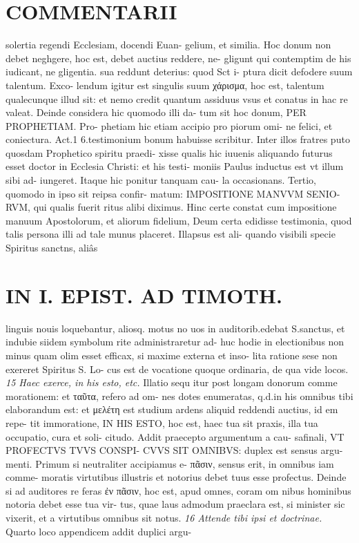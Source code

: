 \documentclass{article}
\begin{document}
\begin{pages}
\section*{COMMENTARII }
\marginpar{[ p.112 ]}\pstart solertia regendi Ecclesiam, docendi Euan- gelium, et similia. Hoc donum non debet neghgere, hoc est, debet auctius reddere, ne- gligunt qui contemptim de his iudicant, ne gligentia. sua reddunt deterius: quod Sct i- ptura dicit defodere suum talentum. Exco- lendum igitur est singulis suum χάρισμα, hoc est, talentum qualecunque illud sit: et nemo credit quantum assiduus vsus et conatus in hac re valeat.  \pend\pstart Deinde considera hic quomodo illi da- tum sit hoc donum, PER PROPHETIAM. Pro- phetiam hic etiam accipio pro piorum omi- ne felici, et coniectura. Act.1 6.testimonium bonum habuisse scribitur. Inter illos fratres puto quosdam Prophetico spiritu praedi- xisse qualis hic iuuenis aliquando futurus esset doctor in Ecclesia Christi: et his testi- moniis Paulus inductus est vt illum sibi ad- iungeret. Itaque hic ponitur tanquam cau- la occasionans.  \pend\pstart Tertio, quomodo in ipso sit reipsa confir- matum: IMPOSITIONE MANVVM SENIO- RVM, qui qualis fuerit ritus alibi diximus. Hinc certe constat cum impositione manuum Apostolorum, et aliorum fidelium, Deum certa edidisse testimonia, quod talis persona illi ad tale munus placeret. Illapsus est ali- quando visibili specie Spiritus sanctns, aliâs  \pend
\section*{IN I. EPIST. AD TIMOTH. }
\marginpar{[ p.113 ]}\pstart linguis nouis loquebantur, aliosq. motus no uos in auditorib.edebat S.sanctus, et indubie siidem symbolum rite administraretur ad- huc hodie in electionibus non minus quam olim esset efficax, si maxime externa et inso- lita ratione sese non exereret Spiritus S. Lo- cus est de vocatione quoque ordinaria, de qua vide locos.  \pend
\textit{15 Haec exerce, in his esto, etc. }\pstart Illatio sequ itur post longam donorum comme morationem: et ταῦτα, refero ad om- nes dotes enumeratas, q.d.in his omnibus tibi elaborandum est: et μελέτη est studium ardens aliquid reddendi auctius, id em repe- tit immoratione, IN HIS ESTO, hoc est, haec tua sit praxis, illa tua occupatio, cura et soli- citudo. Addit praecepto argumentum a cau- safinali, VT PROFECTVS TVVS CONSPI- CVVS SIT OMNIBVS: duplex est sensus argu- menti. Primum si neutraliter accipiamus e- πᾶσιν, sensus erit, in omnibus iam comme- moratis virtutibus illustris et notorius debet tuus esse profectus. Deinde si ad auditores re feras ἐν πᾶσιν, hoc est, apud omnes, coram om nibus hominibus notoria debet esse tua vir- tus, quae laus admodum praeclara est, si minister sic vixerit, et a virtutibus omnibus sit notus.  \pend
\textit{16 Attende tibi ipsi et doctrinae. }\pstart Quarto loco appendicem addit duplici argu-  \pend

\end{pages}
\end{document}
